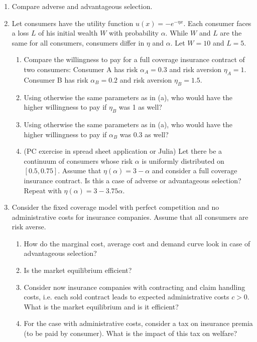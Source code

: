 \documentclass[a4paper]{article}
\begin{document}
\begin{enumerate}[resume]
\item Compare adverse and advantageous selection.

\item Let consumers have the utility function \(u(x)=-e^{-\eta x}\). Each consumer faces a loss \(L\) of his initial wealth \(W\) with probability \(\alpha\). While \(W\) and \(L\) are the same for all consumers, consumers differ in \(\eta\) and \(\alpha\). Let \(W=10\) and \(L=5\).
\begin{enumerate}
\item Compare the willingness to pay for a full coverage insurance contract of two consumers: Consumer A has risk \(\alpha_A=0.3\) and risk aversion \(\eta_A=1\). Consumer B has risk \(\alpha_B=0.2\) and risk aversion \(\eta_B=1.5\).
\item Using otherwise the same parameters as in (a), who would have the higher willingness to pay if \(\eta_B\) was 1 as well?
\item Using otherwise the same parameters as in (a), who would have the higher willingness to pay if \(\alpha_B\) was 0.3 as well?
\item (PC exercise in spread sheet application or Julia) Let there be a continuum of consumers whose risk \(\alpha\) is uniformly distributed on \([0.5,0.75]\). Assume that \(\eta(\alpha)=3-\alpha\) and consider a full coverage insurance contract. Is this a case of adverse or advantageous selection? Repeat with \(\eta(\alpha)=3-3.75\alpha\).
\end{enumerate}

\item Consider the fixed coverage model with perfect competition and no administrative costs for insurance companies. Assume that all consumers are risk averse. 
\begin{enumerate}
\item How do the marginal cost, average cost and demand curve look in case of advantageous selection?
\item Is the market equilibrium efficient?
\item Consider now insurance companies with contracting and claim handling costs, i.e. each sold contract leads to expected administrative costs \(c>0\). What is the market equilibrium and is it efficient?
\item For the case with administrative costs, consider a tax on insurance premia (to be paid by consumer). What is the impact of this tax on welfare?
\end{enumerate}
\end{enumerate}
\end{document}
